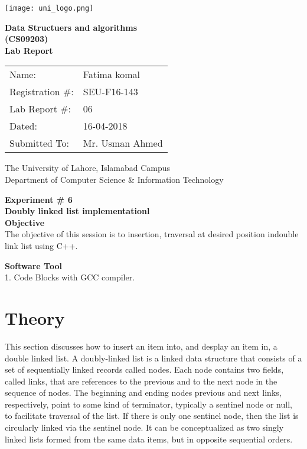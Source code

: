 \documentclass[11pt]{article}            %
\begin{document}
\begin{titlepage}
    \centering
  \vfill
    \texttt{[image: uni\_logo.png]} \\ 
	\vskip2cm
    {\bfseries\Large
	Data Structuers and algorithms \\ (CS09203)\\
	
	\vskip2cm
	Lab Report 
	 
	\vskip2cm
	}    

\begin{center}
\begin{tabular}{ l l  } 

Name: & Fatima komal \\ 
Registration \#: & SEU-F16-143 \\ 
Lab Report \#: & 06 \\ 
 Dated:& 16-04-2018\\ 
Submitted To:& Mr. Usman Ahmed\\ 

\end{tabular}
\end{center}
    \vfill
    The University of Lahore, Islamabad Campus\\
Department of Computer Science \& Information Technology
\end{titlepage}


    
    {\bfseries\Large
\centering
	Experiment \# 6 \\

Doubly linked list implementationl \\
	
	}    
 \vskip1cm
 \textbf {Objective}\\ The objective of this session is to insertion, traversal at desired position indouble link list 
using C++. 
 
 \textbf {Software Tool} \\
 1. Code Blocks with GCC compiler.

\section{Theory }              

This section discusses how to insert an item into, and desplay an item in, a double linked list. 
A doubly-linked list is a linked data structure that consists of a set of sequentially linked records called nodes. Each node contains two fields, called links, that are references to the previous and to the next node in the sequence of nodes. The beginning and ending nodes previous and next links, respectively, point to some kind of terminator, typically a sentinel node or null, to facilitate traversal of the list. If there is only one sentinel node, then the list is circularly linked via the sentinel node. It can be conceptualized as two singly linked lists formed from the same data items, but in opposite sequential orders.
\end{document}
